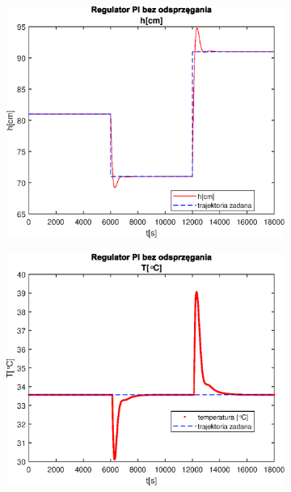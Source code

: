 \begin{figure}[h!]
   \centering
   \begin{subfigure}[b]{0.4\textwidth}
      \includegraphics[width=1\linewidth]{img/PI/noDecoupler/noDisturbance/PINoDecouplerH2Linfalse.eps}
      \caption{}
      \label{fig:fig:PINodDecoupler2Linfalse1}
   \end{subfigure}
       
   \begin{subfigure}[b]{0.4\textwidth}
      \includegraphics[width=1\linewidth]{img/PI/noDecoupler/noDisturbance/PINoDecouplerT2Linfalse.eps}
      \caption{}
      \label{fig:fig:PINodDecoupler2Linfalse2}
   \end{subfigure}
       

\end{figure}
